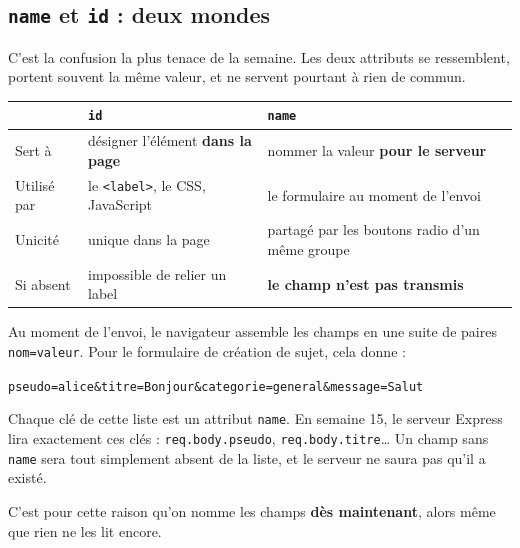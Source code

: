 \documentclass[a4paper,11pt]{article}
\newcommand{\hdr}[1]{\multicolumn{1}{l}{\color{white}\bfseries #1}}
\renewcommand{\arraystretch}{1.3}
\begin{document}
\subsection{\texttt{name} et \texttt{id} : deux mondes}

C'est la confusion la plus tenace de la semaine. Les deux attributs se ressemblent, portent souvent la même valeur, et ne servent pourtant à rien de commun.

\begin{center}
\renewcommand{\arraystretch}{1.0}
\begin{tabularx}{\linewidth}{p{2cm}XX}
  \toprule
  \rowcolor{uniNavy}
  \hdr{} & \hdr{\texttt{id}} & \hdr{\texttt{name}} \\
  \midrule
  \rowcolor{uniPaper}
  Sert à & désigner l'élément \textbf{dans la page} & nommer la valeur \textbf{pour le serveur} \\
  Utilisé par & le \texttt{<label>}, le CSS, JavaScript & le formulaire au moment de l'envoi \\
  \rowcolor{uniPaper}
  Unicité & unique dans la page & partagé par les boutons radio d'un même groupe \\
  Si absent & impossible de relier un label & \textbf{le champ n'est pas transmis} \\
  \bottomrule
\end{tabularx}
\end{center}

\begin{tcolorbox}[definition, title={Aperçu --- ce que le serveur recevra en semaine 15}]
Au moment de l'envoi, le navigateur assemble les champs en une suite de paires \texttt{nom=valeur}. Pour le formulaire de création de sujet, cela donne :

\vspace{4pt}
\texttt{\small pseudo=alice\&titre=Bonjour\&categorie=general\&message=Salut}

\vspace{4pt}
Chaque clé de cette liste est un attribut \texttt{name}. En semaine 15, le serveur Express lira exactement ces clés : \texttt{req.body.pseudo}, \texttt{req.body.titre}\dots{} Un champ sans \texttt{name} sera tout simplement absent de la liste, et le serveur ne saura pas qu'il a existé.

\vspace{3pt}
C'est pour cette raison qu'on nomme les champs \textbf{dès maintenant}, alors même que rien ne les lit encore.
\end{tcolorbox}
\end{document}
